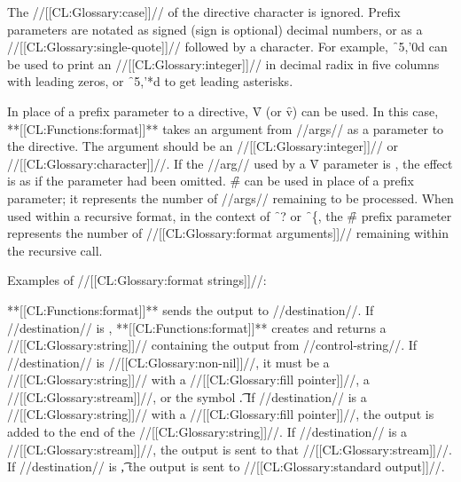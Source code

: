 The //[[CL:Glossary:case]]// of the directive character is ignored.
Prefix parameters are notated as signed (sign is optional) decimal numbers,
or as a //[[CL:Glossary:single-quote]]// followed by a character.
For example, \f{~5,'0d} can be used
to print an //[[CL:Glossary:integer]]// 
in decimal radix in five columns with leading zeros,
or \f{~5,'*d} to get leading asterisks.


In place of a prefix parameter to a directive, \f{V} (or \f{v}) can be used. 
In this case, **[[CL:Functions:format]]** takes an argument from //args// as a parameter to
the directive.  The argument should be an //[[CL:Glossary:integer]]// or //[[CL:Glossary:character]]//.
If the //arg// used by a \f{V} parameter is \nil,
the effect is as if the parameter had been omitted.
\f{\#} can be used in place of a prefix parameter; it
represents the number of //args// remaining to be processed.
When used within a recursive format, in the context of \f{~?} or \f{~\{},
the \f{\#} prefix parameter represents the number of //[[CL:Glossary:format arguments]]//
remaining within the recursive call.

Examples of //[[CL:Glossary:format strings]]//:


**[[CL:Functions:format]]** sends the output to //destination//.
If //destination// is \nil,
**[[CL:Functions:format]]** creates and returns a //[[CL:Glossary:string]]// 
containing the output from //control-string//.
If //destination// is //[[CL:Glossary:non-nil]]//, 
it must be a //[[CL:Glossary:string]]// with a //[[CL:Glossary:fill pointer]]//, 
a //[[CL:Glossary:stream]]//, or the symbol \t.
If //destination// is a //[[CL:Glossary:string]]// with a //[[CL:Glossary:fill pointer]]//, 
the output is added to the end of the //[[CL:Glossary:string]]//. 
If //destination// is a //[[CL:Glossary:stream]]//, 
the output is sent to that //[[CL:Glossary:stream]]//. 
If //destination// is \t,
the output is sent to //[[CL:Glossary:standard output]]//.






